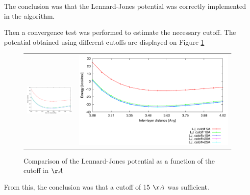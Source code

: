 The conclusion was that the Lennard-Jones potential was correctly implemented in the algorithm.




\begin{samepage}


Then a convergence test was performed to estimate the necessary cutoff. The potential obtained using different cutoffs are displayed on Figure \ref{fig:LJ_conv}

\begin{figure}[H]
\centering
\begin{tabular}{cr}
\includegraphics[width=6cm]{images/LJ_conv.pdf}& 
\includegraphics{images/key_lj.pdf} \\
\end{tabular}
\caption{Comparison of the Lennard-Jones potential as a function of the cutoff in $\AA$}
\label{fig:LJ_conv}
\end{figure}

From this, the conclusion was that a cutoff of 15 $\AA$ was sufficient.
\end{samepage}


